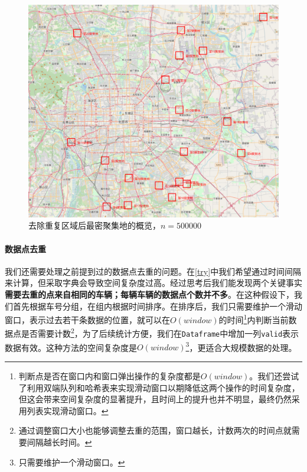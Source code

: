 \documentclass[UTF8]{ctexart}
\begin{document}
\begin{figure}[htb]
    \centering
    \includegraphics[width = \textwidth]{../img/去重.png}
    \caption{去除重复区域后最密聚集地的概览，$n=500000$}
    \label{drop}
\end{figure}

\paragraph{数据点去重} 我们还需要处理之前提到过的数据点去重的问题。在\ref{try}中我们希望通过时间间隔来计算，但采取字典会导致空间复杂度过高。经过思考后我们能发现两个关键事实\textbf{需要去重的点来自相同的车辆；每辆车辆的数据点个数并不多}。在这种假设下，我们首先根据车号分组，在组内根据时间排序。在排序后，我们只需要维护一个滑动窗口，表示过去若干条数据的位置，就可以在$O(window)$的时间\footnote{判断点是否在窗口内和窗口弹出操作的复杂度都是$O(window)$。我们还尝试了利用双端队列和哈希表来实现滑动窗口以期降低这两个操作的时间复杂度，但这会带来空间复杂度的显著提升，且时间上的提升也并不明显，最终仍然采用列表实现滑动窗口。}内判断当前数据点是否需要计数\footnote{通过调整窗口大小也能够调整去重的范围，窗口越长，计数两次的时间点就需要间隔越长时间。}，为了后续统计方便，我们在\texttt{Dataframe}中增加一列\texttt{valid}表示数据有效。这种方法的空间复杂度是$O(window)$\footnote{只需要维护一个滑动窗口。}，更适合大规模数据的处理。
\end{document}
